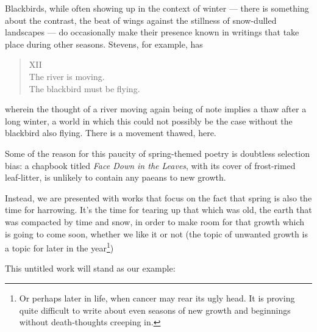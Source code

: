 \documentclass[12pt]{memoir}
\begin{document}
Blackbirds, while often showing up in the context of winter --- there is something about the contrast, the beat of wings against the stillness of snow-dulled landscapes --- do occasionally make their presence known in writings that take place during other seasons. Stevens, for example, has

\begin{verse}
XII \\
The river is moving. \\
The blackbird must be flying.

\parencite{blackbird}
\end{verse}
wherein the thought of a river moving again being of note implies a thaw after a long winter, a world in which this could not possibly be the case without the blackbird also flying. There is a movement thawed, here.

Some of the reason for this paucity of spring-themed poetry is doubtless selection bias: a chapbook titled \emph{Face Down in the Leaves}, with its cover of frost-rimed leaf-litter, is unlikely to contain any paeans to new growth.

Instead, we are presented with works that focus on the fact that spring is also the time for harrowing. It's the time for tearing up that which was old, the earth that was compacted by time and snow, in order to make room for that growth which is going to come soon, whether we like it or not (the topic of unwanted growth is a topic for later in the year\footnote{Or perhaps later in life, when cancer may rear its ugly head. It is proving quite difficult to write about even seasons of new growth and beginnings without death-thoughts creeping in.})

This untitled work will stand as our example:
\end{document}
